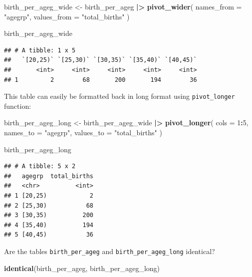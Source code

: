 \documentclass[
]{book}
\newenvironment{Shaded}{\begin{snugshade}}{\end{snugshade}}
\newcommand{\AttributeTok}[1]{\textcolor[rgb]{0.13,0.29,0.53}{#1}}
\newcommand{\DecValTok}[1]{\textcolor[rgb]{0.00,0.00,0.81}{#1}}
\newcommand{\FunctionTok}[1]{\textcolor[rgb]{0.13,0.29,0.53}{\textbf{#1}}}
\newcommand{\NormalTok}[1]{#1}
\newcommand{\OtherTok}[1]{\textcolor[rgb]{0.56,0.35,0.01}{#1}}
\newcommand{\SpecialCharTok}[1]{\textcolor[rgb]{0.81,0.36,0.00}{\textbf{#1}}}
\newcommand{\StringTok}[1]{\textcolor[rgb]{0.31,0.60,0.02}{#1}}
\theoremstyle{definition}
\theoremstyle{definition}
\theoremstyle{definition}
\theoremstyle{definition}
\theoremstyle{remark}
\begin{document}
\begin{Shaded}
\begin{Highlighting}[]
\NormalTok{birth\_per\_ageg\_wide }\OtherTok{\textless{}{-}}
\NormalTok{  birth\_per\_ageg }\SpecialCharTok{|\textgreater{}}
  \FunctionTok{pivot\_wider}\NormalTok{(}
    \AttributeTok{names\_from =} \StringTok{"agegrp"}\NormalTok{, }
    \AttributeTok{values\_from =} \StringTok{"total\_births"}
\NormalTok{  )}

\NormalTok{birth\_per\_ageg\_wide}
\end{Highlighting}
\end{Shaded}

\begin{verbatim}
## # A tibble: 1 x 5
##   `[20,25)` `[25,30)` `[30,35)` `[35,40)` `[40,45)`
##       <int>     <int>     <int>     <int>     <int>
## 1         2        68       200       194        36
\end{verbatim}

This table can easily be formatted back in long format using \texttt{pivot\_longer} function:

\begin{Shaded}
\begin{Highlighting}[]
\NormalTok{birth\_per\_ageg\_long }\OtherTok{\textless{}{-}}
\NormalTok{  birth\_per\_ageg\_wide }\SpecialCharTok{|\textgreater{}}
  \FunctionTok{pivot\_longer}\NormalTok{(}
    \AttributeTok{cols =} \DecValTok{1}\SpecialCharTok{:}\DecValTok{5}\NormalTok{, }
    \AttributeTok{names\_to =} \StringTok{"agegrp"}\NormalTok{, }
    \AttributeTok{values\_to =} \StringTok{"total\_births"}
\NormalTok{  )}

\NormalTok{birth\_per\_ageg\_long}
\end{Highlighting}
\end{Shaded}

\begin{verbatim}
## # A tibble: 5 x 2
##   agegrp  total_births
##   <chr>          <int>
## 1 [20,25)            2
## 2 [25,30)           68
## 3 [30,35)          200
## 4 [35,40)          194
## 5 [40,45)           36
\end{verbatim}

Are the tables \texttt{birth\_per\_ageg} and \texttt{birth\_per\_ageg\_long} identical?

\begin{Shaded}
\begin{Highlighting}[]
\FunctionTok{identical}\NormalTok{(birth\_per\_ageg, birth\_per\_ageg\_long)}
\end{Highlighting}
\end{Shaded}
\end{document}
